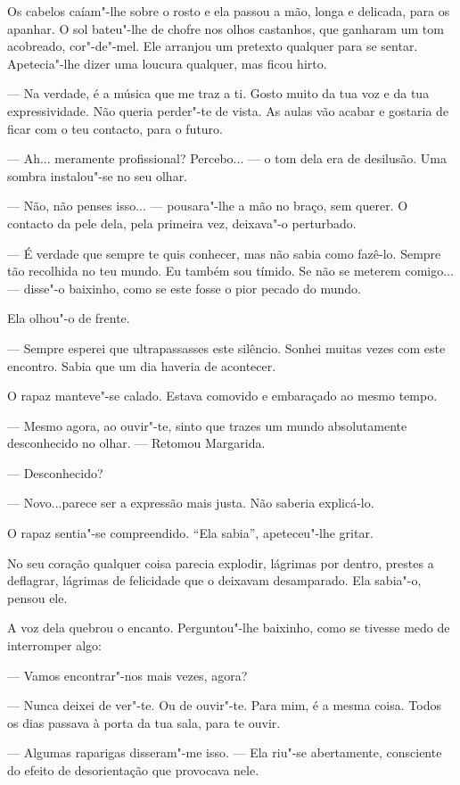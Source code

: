 Os cabelos caíam"-lhe sobre o rosto e ela passou a mão, longa e delicada,
para os apanhar. O sol bateu"-lhe de chofre nos olhos castanhos, que
ganharam um tom acobreado, cor"-de"-mel. Ele arranjou um pretexto qualquer
para se sentar. Apetecia"-lhe dizer uma loucura qualquer, mas ficou
hirto.

--- Na verdade, é a música que me traz a ti. Gosto muito da tua voz e da
tua expressividade. Não queria perder"-te de vista. As aulas vão acabar e
gostaria de ficar com o teu contacto, para o futuro.

--- Ah... meramente profissional? Percebo... --- o tom dela era de desilusão.
Uma sombra instalou"-se no seu olhar.

--- Não, não penses isso... --- pousara"-lhe a mão no braço, sem querer. O
contacto da pele dela, pela primeira vez, deixava"-o perturbado.

--- É verdade que sempre te quis conhecer, mas não sabia como fazê-lo.
Sempre tão recolhida no teu mundo. Eu também sou tímido. Se não se
meterem comigo... --- disse"-o baixinho, como se este fosse o pior pecado
do mundo.

Ela olhou"-o de frente.

--- Sempre esperei que ultrapassasses este silêncio. Sonhei muitas vezes
com este encontro. Sabia que um dia haveria de acontecer.

O rapaz manteve"-se calado. Estava comovido e embaraçado ao mesmo tempo.

--- Mesmo agora, ao ouvir"-te, sinto que trazes um mundo absolutamente
desconhecido no olhar. ---  Retomou Margarida.

--- Desconhecido?

--- Novo...parece ser a expressão mais justa. Não saberia explicá-lo.

O rapaz sentia"-se compreendido. ``Ela sabia'', apeteceu"-lhe gritar.

No seu coração qualquer coisa parecia explodir, lágrimas por dentro,
prestes a deflagrar, lágrimas de felicidade que o deixavam desamparado.
Ela sabia"-o, pensou ele.

A voz dela quebrou o encanto. Perguntou"-lhe baixinho, como se tivesse
medo de interromper algo:

--- Vamos encontrar"-nos mais vezes, agora?

--- Nunca deixei de ver"-te. Ou de ouvir"-te. Para mim, é a mesma coisa.
Todos os dias passava à porta da tua sala, para te ouvir.

--- Algumas raparigas disseram"-me isso. --- Ela riu"-se abertamente,
consciente do efeito de desorientação que provocava nele.

